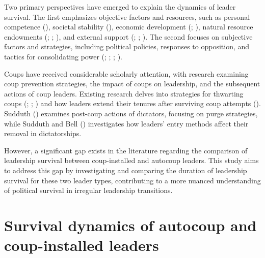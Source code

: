 \documentclass[
  12pt,
]{report}
\begin{document}
Two primary perspectives have emerged to explain the dynamics of leader
survival. The first emphasizes objective factors and resources, such as
personal competence (),
societal stability (), economic
development (;
), natural resource endowments
(;
;
), and
external support (;
; ). The second focuses on subjective factors and
strategies, including political policies, responses to opposition, and
tactics for consolidating power (; ;
;
).

Coups have received considerable scholarly attention, with research
examining coup prevention strategies, the impact of coups on leadership,
and the subsequent actions of coup leaders. Existing research delves
into strategies for thwarting coups (; ;
) and how leaders extend their
tenures after surviving coup attempts (). Sudduth () examines
post-coup actions of dictators, focusing on purge strategies, while
Sudduth and Bell () investigates how
leaders' entry methods affect their removal in dictatorships.

However, a significant gap exists in the literature regarding the
comparison of leadership survival between coup-installed and autocoup
leaders. This study aims to address this gap by investigating and
comparing the duration of leadership survival for these two leader
types, contributing to a more nuanced understanding of political
survival in irregular leadership transitions.

\section{Survival dynamics of autocoup and coup-installed
leaders}\label{survival-dynamics-of-autocoup-and-coup-installed-leaders}
\end{document}

